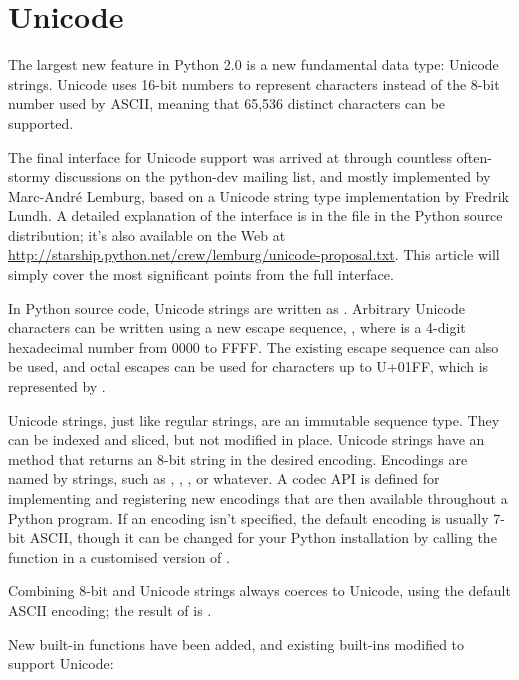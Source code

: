 \documentclass{howto}
\begin{document}
\section{Unicode}

The largest new feature in Python 2.0 is a new fundamental data type:
Unicode strings.  Unicode uses 16-bit numbers to represent characters
instead of the 8-bit number used by ASCII, meaning that 65,536
distinct characters can be supported.

The final interface for Unicode support was arrived at through
countless often-stormy discussions on the python-dev mailing list, and
mostly implemented by Marc-Andr\'e Lemburg, based on a Unicode string
type implementation by Fredrik Lundh.  A detailed explanation of the
interface is in the file  in the Python source
distribution; it's also available on the Web at
\url{http://starship.python.net/crew/lemburg/unicode-proposal.txt}.
This article will simply cover the most significant points from the
full interface.

In Python source code, Unicode strings are written as
.  Arbitrary Unicode characters can be written using a
new escape sequence, , where  is a
4-digit hexadecimal number from 0000 to FFFF.  The existing
 escape sequence can also be used, and octal
escapes can be used for characters up to U+01FF, which is represented
by .

Unicode strings, just like regular strings, are an immutable sequence
type.  They can be indexed and sliced, but not modified in place.
Unicode strings have an  method
that returns an 8-bit string in the desired encoding.  Encodings are
named by strings, such as , ,
, or whatever.  A codec API is defined for
implementing and registering new encodings that are then available
throughout a Python program.  If an encoding isn't specified, the
default encoding is usually 7-bit ASCII, though it can be changed for
your Python installation by calling the
 function in a
customised version of .

Combining 8-bit and Unicode strings always coerces to Unicode, using
the default ASCII encoding; the result of  is
.

New built-in functions have been added, and existing built-ins
modified to support Unicode:
\end{document}
